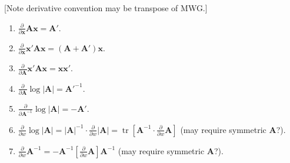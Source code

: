 \documentclass[8pt,letterpaper, landscape]{extarticle} %
\newcommand{\mA}{\ensuremath{\mathbf{A}}}
\newcommand{\mx}{\ensuremath{\mathbf{x}}}
\begin{document}
\begin{multicols}{3}
\begin{description}
 [Note derivative convention may be transpose of MWG.]
\begin{enumerate}
\item $ \tfrac{\partial}{\partial \mx} \mA \mx = \mA' $.
\item $ \tfrac{\partial}{\partial \mx} \mx' \mA \mx = (\mA + \mA') \mx $.
\item $ \tfrac{\partial}{\partial \mA} \mx' \mA \mx = \mx \mx' $.
\item $ \tfrac{\partial}{\partial \mA} \log | \mA | = {\mA'}^{-1} $.
\item $ \tfrac{\partial}{\partial \mA^{-1}} \log | \mA | = - {\mA'} $.
\item $ \tfrac{\partial}{\partial w} \log | \mA | = | \mA |^{-1} \cdot \tfrac{\partial}{\partial w} | \mA | = \operatorname{tr} [\mA ^{-1} \cdot \tfrac{\partial}{\partial w} \mA ] $ (may require symmetric $ \mA $?).
\item $ \tfrac{\partial}{\partial w} \mA^{-1} = - \mA^{-1} [\tfrac{\partial}{\partial w} \mA] \mA^{-1} $ (may require symmetric $ \mA $?).
\end{enumerate}


\end{description}
\end{multicols}
\end{document}
